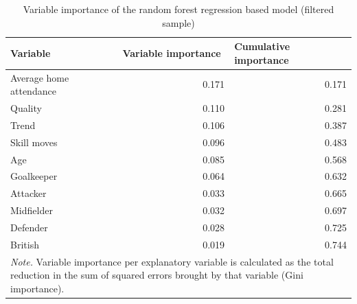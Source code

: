 \begin{table}[htbp]
    \begin{spacing}{1.5}
    \small
    \centering
    \caption{Variable importance of the random forest regression based model (filtered sample)}
    \label{tab:var_importance_filtered_sample}
    \begin{tabular}{lrr}
        \toprule
        \toprule
        \textbf{Variable} & \multicolumn{1}{l}{\textbf{Variable importance}} & \multicolumn{1}{l}{\textbf{Cumulative importance}} \\
        \midrule
        Average home attendance & 0.171 & 0.171 \\
        Quality & 0.110 & 0.281 \\
        Trend & 0.106 & 0.387 \\
        Skill moves & 0.096 & 0.483 \\
        Age   & 0.085 & 0.568 \\
        Goalkeeper & 0.064 & 0.632 \\
        Attacker & 0.033 & 0.665 \\
        Midfielder & 0.032 & 0.697 \\
        Defender & 0.028 & 0.725 \\
        British & 0.019 & 0.744 \\
        \bottomrule
        \bottomrule
        \multicolumn{3}{p{13cm}}{\footnotesize\textit{Note.} Variable importance per explanatory variable is calculated as the total reduction in the sum of squared errors brought by that variable (Gini importance).}
    \end{tabular}
    \end{spacing}
\end{table}

